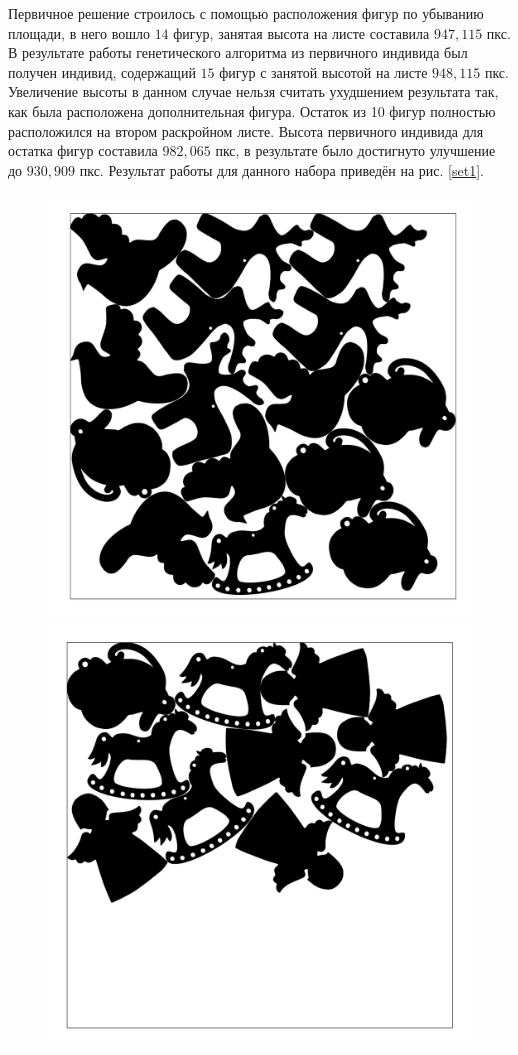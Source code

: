 \documentclass[14pt]{extarticle}
\begin{document}
	Первичное решение строилось с помощью расположения фигур по убыванию площади, в него вошло $14$ фигур, занятая высота на листе составила $947,115$ пкс. В результате работы генетического алгоритма из первичного индивида был получен индивид, содержащий $15$ фигур с занятой высотой на листе $948,115$ пкс. Увеличение высоты в данном случае нельзя считать ухудшением результата так, как была расположена дополнительная фигура. Остаток из 10 фигур полностью расположился на втором раскройном листе. Высота первичного индивида для остатка фигур составила $982,065$ пкс, в результате было достигнуто улучшение до $930,909$ пкс. Результат работы для данного набора приведён на рис. \ref{set1}.
	\begin{figure}[h]
		\centering
		\includegraphics[scale=0.25]{set1_0}
		\includegraphics[scale=0.25]{set1_1}

\end{figure}
\end{document}
